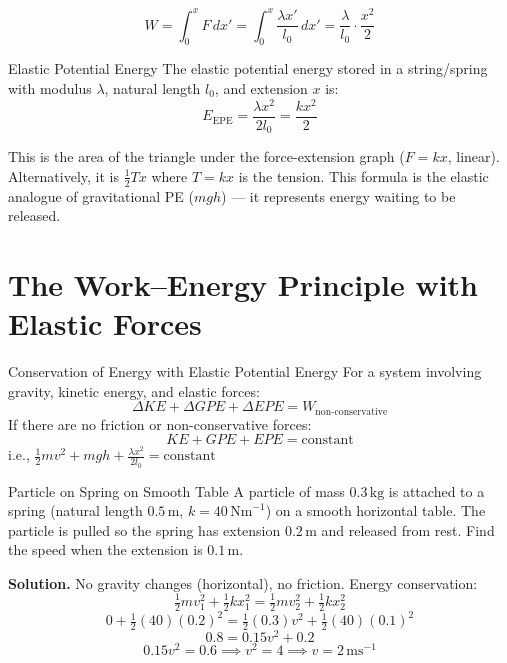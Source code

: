 \documentclass[12pt, a4paper]{book}
\newcommand{\ms}{\,\mathrm{ms}^{-1}}
\newcommand{\kg}{\,\mathrm{kg}}
\newcommand{\m}{\,\mathrm{m}}
\begin{document}
\[
  W = \int_0^x F\,dx' = \int_0^x \frac{\lambda x'}{l_0}\,dx' = \frac{\lambda}{l_0} \cdot \frac{x^2}{2}
\]

\begin{thm}{Elastic Potential Energy}{}
The elastic potential energy stored in a string/spring with modulus $\lambda$, natural length $l_0$, and extension $x$ is:
\[
  \boxed{E_{\text{EPE}} = \frac{\lambda x^2}{2l_0} = \frac{kx^2}{2}}
\]
\end{thm}

\begin{intuitionbox}
This is the area of the triangle under the force-extension graph ($F = kx$, linear). Alternatively, it is $\frac{1}{2}Tx$ where $T = kx$ is the tension. This formula is the elastic analogue of gravitational PE ($mgh$) --- it represents energy waiting to be released.
\end{intuitionbox}

\section{The Work--Energy Principle with Elastic Forces}

\begin{thm}{Conservation of Energy with Elastic Potential Energy}{}
For a system involving gravity, kinetic energy, and elastic forces:
\[
  \Delta KE + \Delta GPE + \Delta EPE = W_{\text{non-conservative}}
\]
If there are no friction or non-conservative forces:
\[
  KE + GPE + EPE = \text{constant}
\]
i.e., $\tfrac{1}{2}mv^2 + mgh + \tfrac{\lambda x^2}{2l_0} = \text{constant}$
\end{thm}

\begin{exmp}{Particle on Spring on Smooth Table}{}
A particle of mass $0.3\kg$ is attached to a spring (natural length $0.5\m$, $k = 40\,\mathrm{Nm}^{-1}$) on a smooth horizontal table. The particle is pulled so the spring has extension $0.2\m$ and released from rest. Find the speed when the extension is $0.1\m$.

\medskip
\textbf{Solution.} No gravity changes (horizontal), no friction. Energy conservation:
\[
  \tfrac{1}{2}mv_1^2 + \tfrac{1}{2}kx_1^2 = \tfrac{1}{2}mv_2^2 + \tfrac{1}{2}kx_2^2
\]
\[
  0 + \tfrac{1}{2}(40)(0.2)^2 = \tfrac{1}{2}(0.3)v^2 + \tfrac{1}{2}(40)(0.1)^2
\]
\[
  0.8 = 0.15v^2 + 0.2
\]
\[
  0.15v^2 = 0.6 \implies v^2 = 4 \implies v = 2\ms
\]
\end{exmp}
\end{document}
